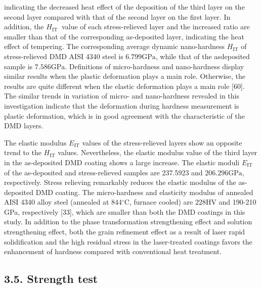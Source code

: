 \documentclass[10pt]{article}
\begin{document}
indicating the decreased heat effect of the deposition of the third layer on the second layer compared with that of the second layer on the first layer. In addition, the $H_{\text {IT }}$ value of each stress-relieved layer and the increased ratio are smaller than that of the corresponding as-deposited layer, indicating the heat effect of tempering. The corresponding average dynamic nano-hardness $H_{\mathrm{IT}}$ of stress-relieved DMD AISI 4340 steel is $6.799 \mathrm{GPa}$, while that of the asdeposited sample is $7.586 \mathrm{GPa}$. Definitions of micro-hardness and nano-hardness display similar results when the plastic deformation plays a main role. Otherwise, the results are quite different when the elastic deformation plays a main role [60]. The similar trends in variation of micro- and nano-hardness revealed in this investigation indicate that the deformation during hardness measurement is plastic deformation, which is in good agreement with the characteristic of the DMD layers.

The elastic modulus $E_{\mathrm{IT}}$ values of the stress-relieved layers show an opposite trend to the $H_{\mathrm{IT}}$ values. Nevertheless, the elastic modulus value of the third layer in the as-deposited DMD coating shows a large increase. The elastic moduli $E_{\mathrm{IT}}$ of the as-deposited and stress-relieved samples are 237.5923 and $206.296 \mathrm{GPa}$, respectively. Stress relieving remarkably reduces the elastic modulus of the as-deposited DMD coating. The micro-hardness and elasticity modulus of annealed AISI 4340 alloy steel (annealed at $844{ }^{\circ} \mathrm{C}$, furnace cooled) are $228 \mathrm{HV}$ and 190-210 GPa, respectively [33], which are smaller than both the DMD coatings in this study. In addition to the phase transformation strengthening effect and solution strengthening effect, both the grain refinement effect as a result of laser rapid solidification and the high residual stress in the laser-treated coatings favors the enhancement of hardness compared with conventional heat treatment.

\subsection*{3.5. Strength test}
\end{document}
